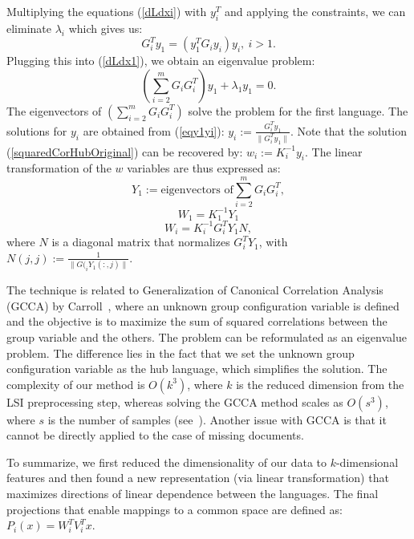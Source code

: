 Multiplying the equations (\ref{dLdxi}) with $y_i^T$ and applying the 
constraints, we can eliminate $\lambda_i$ which gives us:
\begin{equation}\label{eqy1yi}
G_{i}^T y_1 = \left(y_1^T G_{i} y_i \right) y_i,~i > 1.
\end{equation}
Plugging this into (\ref{dLdx1}), we obtain an eigenvalue problem:
$$\left( \sum_{i = 2}^m G_i G_{i}^T \right) y_1 + \lambda_1 y_1 = 0.$$
The eigenvectors of $\left( \sum_{i = 2}^m G_i G_{i}^T \right)$ solve 
the problem for the first language. The solutions for $y_i$ are obtained 
from (\ref{eqy1yi}): $y_i := \frac{G_{i}^T y_1}{\| G_{i}^T y_1 \|}$.
Note that the solution (\ref{squaredCorHubOriginal}) can be recovered 
by: $w_i := K_i^{-1} y_i$. The linear transformation of the $w$ 
variables are thus expressed as:
$$ Y_1 := \text{eigenvectors of} \sum_{i = 2}^m G_i G_{i}^T, $$
$$ W_1 = K_1^{-1} Y_1 $$
$$ W_i = K_i^{-1} G_{i}^T Y_1 N,$$
where $N$ is a diagonal matrix that normalizes $G_{i}^T Y_1$, with 
$N(j,j) := \frac{1}{\|G(_{i} Y_1(:,j)\|}$.

 The technique is related to  Generalization of Canonical 
Correlation Analysis (GCCA) by Carroll~\citeyear{Carroll}, where an unknown 
group configuration variable is defined and the objective is to maximize the 
sum of squared correlations between the group variable and the others. The 
problem can be reformulated as an eigenvalue problem. The difference lies in 
the fact that we set the unknown group configuration variable as the hub language, 
which simplifies the solution. The complexity of our method is $O(k^3)$, where $k$ 
is the reduced dimension from the LSI preprocessing step, whereas solving the 
GCCA method scales as $O(s^3)$, where $s$ is the number of samples (see~\cite{gifi}). 
Another issue with GCCA is that it cannot be directly applied to the case of missing documents.

To summarize, we first reduced the dimensionality of our data to $k$-dimensional 
features and then found a new representation (via linear transformation) that 
maximizes directions of linear dependence between the languages. The final 
projections that enable mappings to a common space are defined as: 
$P_i(x) = W_i^T V_i^T x.$

